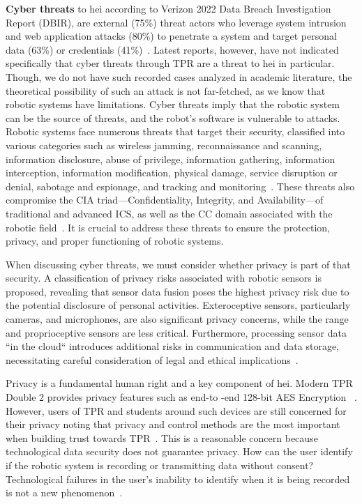 \textbf{Cyber threats} to \ac{hei} according to Verizon 2022 Data Breach Investigation Report (DBIR), are external (75\%) threat actors
who leverage system intrusion and web application attacks
(80\%) to penetrate a system and target personal data (63\%) or credentials (41\%)~\cite[57]{dbir_2022}. Latest reports, however, have not
indicated specifically that cyber threats through \ac{TPR} are a threat to \ac{hei} in particular. Though, we do not
have such recorded cases analyzed in academic literature, the theoretical possibility of such an attack is not far-fetched, as we
know that robotic systems have limitations. Cyber threats imply that the robotic system can be the source of threats, and the robot's software is vulnerable to attacks. Robotic systems face numerous threats that target their security, classified into various categories such as wireless jamming,
reconnaissance and scanning, information disclosure, abuse of privilege, information gathering, information interception, information
modification, physical damage, service disruption or denial, sabotage and espionage, and tracking and monitoring~\cite[122]{robotics_cyber_security_2022}. These threats also
compromise the CIA triad—Confidentiality, Integrity, and Availability—of traditional and advanced \ac{ICS}, as
well as the \ac{CC} domain associated with the robotic field~\cite[116]{robotics_cyber_security_2022}. It is crucial to address these threats to ensure the protection, privacy, and proper functioning of robotic systems.

When discussing cyber threats, we must consider whether privacy is part of that security. A classification of privacy risks
associated with robotic sensors is proposed, revealing that sensor data fusion poses the highest privacy risk due to the potential
disclosure of personal activities. Exteroceptive sensors, particularly cameras, and microphones, are also significant privacy concerns,
while the range and proprioceptive sensors are less critical. Furthermore, processing sensor data ``in the cloud`` introduces
additional risks in communication and data storage, necessitating careful consideration of legal and ethical implications~\cite[82-84]{cyber_sec_robotics_privacy_safety_2017}.

Privacy is a fundamental human right and a key component of \ac{hei}. Modern \ac{TPR} Double 2 provides privacy features such as end-to
-end 128-bit AES Encryption
~\cite[544]{telepresence_robots_in_classroom_2019}. However, users of \ac{TPR} and students around such devices are still concerned for
their privacy noting that privacy and control methods are the
most important when building trust towards \ac{TPR}~\cite[59]{telepresence_perspective_psychology_educational_2022}.
This is a reasonable concern because technological data security does not guarantee privacy. How can the user identify if the robotic
system is recording or transmitting data without consent? Technological failures in the user's inability to identify when it is being recorded is not a new phenomenon~\cite[]{is_my_phone_listening_2019}.

